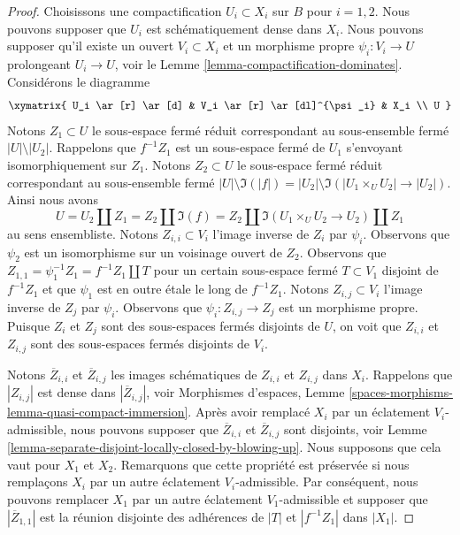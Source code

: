 \begin{proof}
Choisissons une compactification $U_i \subset X_i$ sur $B$ pour $i = 1, 2$. Nous pouvons supposer que $U_i$ est schématiquement dense dans $X_i$. Nous pouvons supposer qu'il existe un ouvert $V_i \subset X_i$ et un morphisme propre $\psi_i : V_i \to U$ prolongeant $U_i \to U$, voir le Lemme \ref{lemma-compactification-dominates}. Considérons le diagramme
$$
\xymatrix{
U_i \ar[r] \ar[d] & V_i \ar[r] \ar[dl]^{\psi_i} & X_i \\
U
}
$$
Notons $Z_1 \subset U$ le sous-espace fermé réduit correspondant au sous-ensemble fermé $|U| \setminus |U_2|$. Rappelons que $f^{-1}Z_1$ est un sous-espace fermé de $U_1$ s'envoyant isomorphiquement sur $Z_1$. Notons $Z_2 \subset U$ le sous-espace fermé réduit correspondant au sous-ensemble fermé $|U| \setminus \Im(|f|) =
|U_2| \setminus \Im(|U_1 \times_U U_2| \to |U_2|)$. Ainsi nous avons
$$
U = U_2 \amalg Z_1 = Z_2 \amalg \Im(f) =
Z_2 \amalg \Im(U_1 \times_U U_2 \to U_2) \amalg Z_1
$$
au sens ensembliste. Notons $Z_{i, i} \subset V_i$ l'image inverse de $Z_i$ par $\psi_i$. Observons que $\psi_2$ est un isomorphisme sur un voisinage ouvert de $Z_2$. Observons que $Z_{1, 1} = \psi_1^{-1}Z_1 = f^{-1}Z_1 \amalg T$ pour un certain sous-espace fermé $T \subset V_1$ disjoint de $f^{-1}Z_1$ et que $\psi_1$ est en outre \'etale le long de $f^{-1}Z_1$.  
Notons $Z_{i, j} \subset V_i$ l'image inverse de $Z_j$ par $\psi_i$.  
Observons que $\psi_i : Z_{i, j} \to Z_j$ est un morphisme propre.  
Puisque $Z_i$ et $Z_j$ sont des sous-espaces fermés disjoints de $U$, on voit que $Z_{i, i}$ et $Z_{i, j}$ sont des sous-espaces fermés disjoints de $V_i$.

\medskip\noindent
Notons $\overline{Z}_{i, i}$ et $\overline{Z}_{i, j}$ les images schématiques de $Z_{i, i}$ et $Z_{i, j}$ dans $X_i$.
Rappelons que $|Z_{i, j}|$ est dense dans $|\overline{Z}_{i, j}|$, voir
Morphismes d'espaces, Lemme
\ref{spaces-morphisms-lemma-quasi-compact-immersion}.
Après avoir remplacé $X_i$ par un éclatement $V_i$-admissible, nous pouvons supposer que $\overline{Z}_{i, i}$ et $\overline{Z}_{i, j}$ sont disjoints, voir
Lemme \ref{lemma-separate-disjoint-locally-closed-by-blowing-up}.
Nous supposons que cela vaut pour $X_1$ et $X_2$.
Remarquons que cette propriété est préservée si nous remplaçons $X_i$ par un autre éclatement $V_i$-admissible. Par conséquent, nous pouvons remplacer $X_1$ par un autre éclatement $V_1$-admissible et supposer que $|\overline{Z}_{1, 1}|$ est la réunion disjointe des adhérences de $|T|$ et $|f^{-1}Z_1|$ dans $|X_1|$.


\end{proof}
